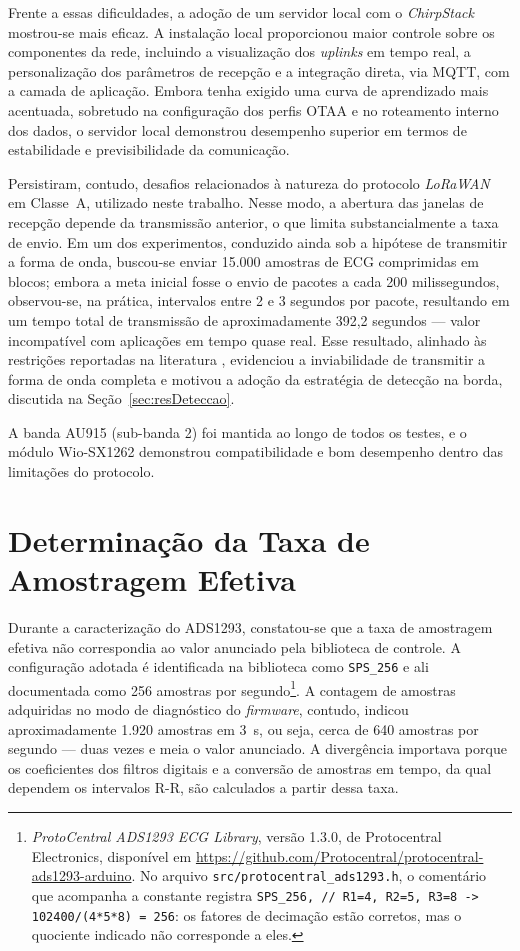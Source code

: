 Frente a essas dificuldades, a adoção de um servidor local com o \textit{ChirpStack} mostrou-se mais eficaz. A instalação local proporcionou maior controle sobre os componentes da rede, incluindo a visualização dos \textit{uplinks} em tempo real, a personalização dos parâmetros de recepção e a integração direta, via \acs{MQTT}, com a camada de aplicação. Embora tenha exigido uma curva de aprendizado mais acentuada, sobretudo na configuração dos perfis \acs{OTAA} e no roteamento interno dos dados, o servidor local demonstrou desempenho superior em termos de estabilidade e previsibilidade da comunicação.

Persistiram, contudo, desafios relacionados à natureza do protocolo \textit{LoRaWAN} em Classe~A, utilizado neste trabalho. Nesse modo, a abertura das janelas de recepção depende da transmissão anterior, o que limita substancialmente a taxa de envio. Em um dos experimentos, conduzido ainda sob a hipótese de transmitir a forma de onda, buscou-se enviar 15.000 amostras de \acs{ECG} comprimidas em blocos; embora a meta inicial fosse o envio de pacotes a cada 200 milissegundos, observou-se, na prática, intervalos entre 2 e 3 segundos por pacote, resultando em um tempo total de transmissão de aproximadamente 392,2 segundos — valor incompatível com aplicações em tempo quase real. Esse resultado, alinhado às restrições reportadas na literatura \citep{lorawanWaveform, 3-lead}, evidenciou a inviabilidade de transmitir a forma de onda completa e motivou a adoção da estratégia de detecção na borda, discutida na Seção~\ref{sec:resDeteccao}.

A banda AU915 (sub-banda 2) foi mantida ao longo de todos os testes, e o módulo Wio-SX1262 demonstrou compatibilidade e bom desempenho dentro das limitações do protocolo.

\section{Determinação da Taxa de Amostragem Efetiva}
\label{sec:resTaxa}

Durante a caracterização do ADS1293, constatou-se que a taxa de amostragem efetiva não correspondia ao valor anunciado pela biblioteca de controle. A configuração adotada é identificada na biblioteca como \texttt{SPS\_256} e ali documentada como 256 amostras por segundo\footnote{\textit{ProtoCentral ADS1293 ECG Library}, versão 1.3.0, de Protocentral Electronics, disponível em \url{https://github.com/Protocentral/protocentral-ads1293-arduino}. No arquivo \texttt{src/protocentral\_ads1293.h}, o comentário que acompanha a constante registra \texttt{SPS\_256, // R1=4, R2=5, R3=8 -> 102400/(4*5*8) = 256}: os fatores de decimação estão corretos, mas o quociente indicado não corresponde a eles.}. A contagem de amostras adquiridas no modo de diagnóstico do \textit{firmware}, contudo, indicou aproximadamente 1.920 amostras em 3~s, ou seja, cerca de 640 amostras por segundo --- duas vezes e meia o valor anunciado. A divergência importava porque os coeficientes dos filtros digitais e a conversão de amostras em tempo, da qual dependem os intervalos R-R, são calculados a partir dessa taxa.

